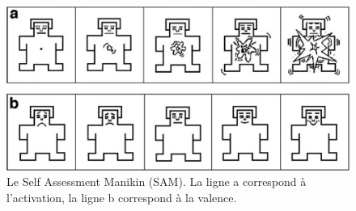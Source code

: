 \begin{figure}
  \centering
  \includegraphics[width=12cm]{./Chapitre4/figures/sam.jpeg}
  \caption{Le Self Assessment Manikin (SAM). La ligne a correspond à l'activation, la ligne b correspond à la valence.}
  \label{fig:SAM}
\end{figure}
